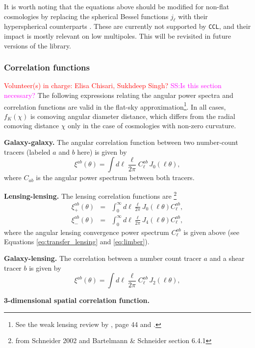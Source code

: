 \documentclass[\docopts]{\docclass}
\newcommand{\vol}[1]{\textcolor{red}{Volunteer(s) in charge: #1}}
\newcommand{\sukhdeep}[1]{\textcolor{magenta}{SS:#1}}
\newcommand{\ccl}{{\tt CCL}\xspace}
\begin{document}
It is worth noting that the equations above should be modified for non-flat cosmologies by replacing the spherical Bessel functions $j_\ell$ with their hyperspherical counterparts \cite{1994ApJ...432....7K}. These are currently not supported by \ccl, and their impact is mostly relevant on low multipoles. This will be revisited in future versions of the library.


\subsubsection{Correlation functions}
\vol{Elisa Chisari, Sukhdeep Singh?}
\sukhdeep{Is this section necessary?}
The following expressions relating the angular power spectra and correlation functions are valid in the flat-sky approximation\footnote{See the weak lensing review by \citet{Bartelmann01}, page 44 and \citet{Joachimi10}.}. In all cases, $f_K(\chi)$ is comoving angular diameter distance, which differs from the radial comoving distance $\chi$ only in the case of cosmologies with non-zero curvature.

{\bf Galaxy-galaxy.} The angular correlation function between two number-count tracers (labeled $a$ and $b$ here) is given by
\begin{equation}
  \xi^{ab}(\theta) = \int d\ell \frac{\ell}{2\pi} C^{ab}_\ell\, J_0(\ell\theta),
\label{eq:xiclu}
\end{equation}
where $C_{ab}$ is the angular power spectrum between both tracers.

{\bf Lensing-lensing.} The lensing correlation functions are \footnote{from Schneider 2002 and Bartelmann \& Schneider section 6.4.1}
\begin{eqnarray}
  \xi^{ab}_{+}(\theta)&=&\int_0^{\infty}d\ell\frac{\ell}{2\pi}J_0(\ell\theta)C^{ab}_\ell,\\
  \xi^{ab}_{-}(\theta)&=&\int_0^{\infty}d\ell\frac{\ell}{2\pi}J_4(\ell\theta)C^{ab}_\ell,
\label{eq:xipxim}
\end{eqnarray}
where the angular lensing convergence power spectrum $C^{ab}_\ell$ is given above (see Equations \ref{eq:transfer_lensing} and \ref{eq:limber}).

{\bf Galaxy-lensing.} The correlation between a number count tracer $a$ and a shear tracer $b$ is given by
\begin{equation}
  \xi^{ab}(\theta) = \int d\ell \frac{\ell}{2\pi} C^{ab}_\ell\, J_2(\ell\theta),
\end{equation}

{\bf 3-dimensional spatial correlation function.}
\end{document}
